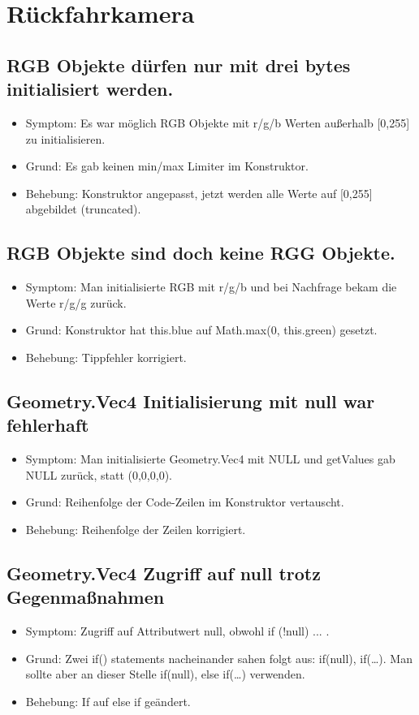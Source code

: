 \documentclass[qualitaetssicherung.tex]{subfiles}
\begin{document}
\section{Rückfahrkamera}

	\subsection{RGB Objekte dürfen nur mit drei bytes initialisiert werden.}
		\begin{itemize}
			\item
			Symptom: Es war möglich RGB Objekte mit r/g/b Werten außerhalb [0,255] zu initialisieren.
			\item
			Grund: Es gab keinen min/max Limiter im Konstruktor.
			\item
			Behebung: Konstruktor angepasst, jetzt werden alle Werte auf [0,255] abgebildet (truncated).
		\end{itemize}
		
	\subsection{RGB Objekte sind doch keine RGG Objekte.}
		\begin{itemize}
			\item
			Symptom: Man initialisierte RGB mit r/g/b und bei Nachfrage bekam die Werte r/g/g zurück.
			\item
			Grund: Konstruktor hat this.blue auf Math.max(0, this.green) gesetzt.
			\item
			Behebung: Tippfehler korrigiert.
		\end{itemize}
	\subsection{Geometry.Vec4 Initialisierung mit null war fehlerhaft}
		\begin{itemize}
			\item
			Symptom: Man initialisierte Geometry.Vec4 mit NULL und getValues gab NULL zurück, statt (0,0,0,0).
			\item
			Grund: Reihenfolge der Code-Zeilen im Konstruktor vertauscht.
			\item
			Behebung: Reihenfolge der Zeilen korrigiert.
		\end{itemize}
	\subsection{Geometry.Vec4 Zugriff auf null trotz Gegenmaßnahmen}
		\begin{itemize}
			\item
			Symptom: Zugriff auf Attributwert null, obwohl if (!null) ... .
			\item
			Grund: Zwei if() statements nacheinander sahen folgt aus: if(null), if(…). Man sollte aber an dieser Stelle if(null), else if(…) verwenden.
			\item
			Behebung: If auf else if geändert.
		\end{itemize}
\end{document}
